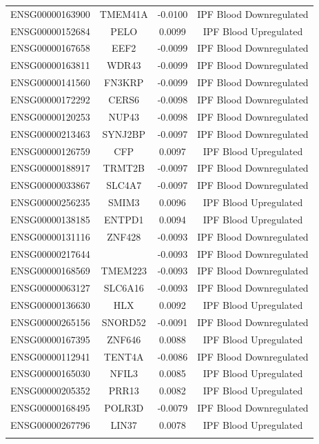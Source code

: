 \documentclass[
]{article}
\begin{document}
\begin{singlespace}
\begin{longtable}[t]{lccc}
ENSG00000163900 & TMEM41A & -0.0100 & IPF Blood Downregulated\\
ENSG00000152684 & PELO & 0.0099 & IPF Blood Upregulated\\
ENSG00000167658 & EEF2 & -0.0099 & IPF Blood Downregulated\\
ENSG00000163811 & WDR43 & -0.0099 & IPF Blood Downregulated\\
ENSG00000141560 & FN3KRP & -0.0099 & IPF Blood Downregulated\\
\addlinespace
ENSG00000172292 & CERS6 & -0.0098 & IPF Blood Downregulated\\
ENSG00000120253 & NUP43 & -0.0098 & IPF Blood Downregulated\\
ENSG00000213463 & SYNJ2BP & -0.0097 & IPF Blood Downregulated\\
ENSG00000126759 & CFP & 0.0097 & IPF Blood Upregulated\\
ENSG00000188917 & TRMT2B & -0.0097 & IPF Blood Downregulated\\
\addlinespace
ENSG00000033867 & SLC4A7 & -0.0097 & IPF Blood Downregulated\\
ENSG00000256235 & SMIM3 & 0.0096 & IPF Blood Upregulated\\
ENSG00000138185 & ENTPD1 & 0.0094 & IPF Blood Upregulated\\
ENSG00000131116 & ZNF428 & -0.0093 & IPF Blood Downregulated\\
ENSG00000217644 &  & -0.0093 & IPF Blood Downregulated\\
\addlinespace
ENSG00000168569 & TMEM223 & -0.0093 & IPF Blood Downregulated\\
ENSG00000063127 & SLC6A16 & -0.0093 & IPF Blood Downregulated\\
ENSG00000136630 & HLX & 0.0092 & IPF Blood Upregulated\\
ENSG00000265156 & SNORD52 & -0.0091 & IPF Blood Downregulated\\
ENSG00000167395 & ZNF646 & 0.0088 & IPF Blood Upregulated\\
\addlinespace
ENSG00000112941 & TENT4A & -0.0086 & IPF Blood Downregulated\\
ENSG00000165030 & NFIL3 & 0.0085 & IPF Blood Upregulated\\
ENSG00000205352 & PRR13 & 0.0082 & IPF Blood Upregulated\\
ENSG00000168495 & POLR3D & -0.0079 & IPF Blood Downregulated\\
ENSG00000267796 & LIN37 & 0.0078 & IPF Blood Upregulated\\
\addlinespace

\end{longtable}
\end{singlespace}
\end{document}
